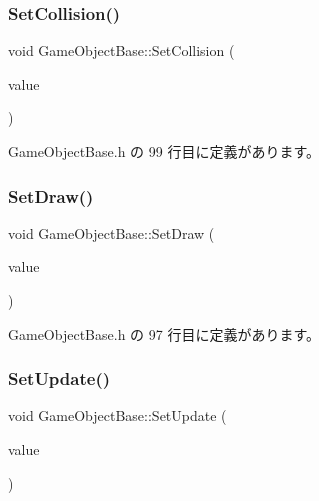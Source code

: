 \mbox{\label{class_game_object_base_a4aeb0212f5a390570d050bfef51b7818}} 
\subsubsection{\texorpdfstring{Set\+Collision()}{SetCollision()}}
{\footnotesize\ttfamily void Game\+Object\+Base\+::\+Set\+Collision (\begin{DoxyParamCaption}\item[{\mbox{\hyperlink{class_collision_base}{Collision\+Base}} $\ast$}]{value }\end{DoxyParamCaption})\hspace{0.3cm}{\ttfamily [inline]}}



 Game\+Object\+Base.\+h の 99 行目に定義があります。

\mbox{\label{class_game_object_base_ab548b4208b8da2af6e3abb533ea53da9}} 
\subsubsection{\texorpdfstring{Set\+Draw()}{SetDraw()}}
{\footnotesize\ttfamily void Game\+Object\+Base\+::\+Set\+Draw (\begin{DoxyParamCaption}\item[{\mbox{\hyperlink{class_draw_base}{Draw\+Base}} $\ast$}]{value }\end{DoxyParamCaption})\hspace{0.3cm}{\ttfamily [inline]}}



 Game\+Object\+Base.\+h の 97 行目に定義があります。

\mbox{\label{class_game_object_base_a71704e8310b3183f3f88869f8fd27d08}} 
\subsubsection{\texorpdfstring{Set\+Update()}{SetUpdate()}}
{\footnotesize\ttfamily void Game\+Object\+Base\+::\+Set\+Update (\begin{DoxyParamCaption}\item[{\mbox{\hyperlink{class_update_base}{Update\+Base}} $\ast$}]{value }\end{DoxyParamCaption})\hspace{0.3cm}{\ttfamily [inline]}}



